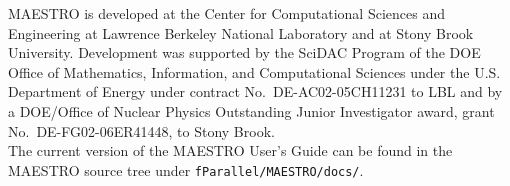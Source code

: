MAESTRO is developed at the Center for Computational Sciences and
Engineering at Lawrence Berkeley National Laboratory and at Stony
Brook University.  Development was supported by the SciDAC Program of
the DOE Office of Mathematics, Information, and Computational Sciences
under the U.S. Department of Energy under contract
No.\ DE-AC02-05CH11231 to LBL and by a DOE/Office of Nuclear Physics
Outstanding Junior Investigator award, grant No.\ DE-FG02-06ER41448,
to Stony Brook. \\

\noindent The current version of the MAESTRO User's Guide can be found in 
the MAESTRO source tree under {\tt fParallel/MAESTRO/docs/}.
